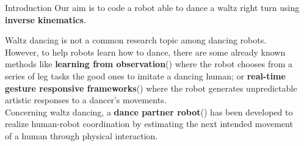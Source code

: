 \documentclass[final]{beamer}
\newlength{\sepwidth}
\newlength{\colwidth}
\newcommand{\separatorcolumn}{\begin{column}{\sepwidth}\end{column}}
\begin{document}
\begin{frame}[t]
\begin{columns}[t]
\separatorcolumn
\begin{column}{\colwidth}
  
  \begin{block}{Introduction}
Our aim is to code a robot able to dance a waltz right turn using \textbf{inverse kinematics}.  
  
Waltz dancing is not a common research topic among dancing robots. 
However, to help robots learn how to dance, there are some already known methods like \textbf{learning from observation}(\cite{traditional_jap_dance}) where the robot chooses from a series of leg tasks the good ones to imitate a dancing human; 
or \textbf{real-time gesture responsive frameworks}(\cite{spectacle_imitation}) where the robot generates unpredictable artistic responses to a dancer's movements. \\ 
Concerning waltz dancing, a \textbf{dance partner robot}(\cite{ballroom_dance}) has been developed to realize human-robot coordination by estimating the next intended movement of a human through physical interaction.
  \end{block}


\end{column}
\end{columns}
\end{frame}
\end{document}
